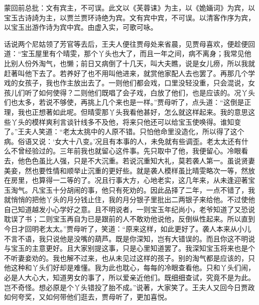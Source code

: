 \begin{parag}
    \begin{note}蒙回前总批：文有宾主，不可误。此文以《芙蓉诔》为主，以《姽婳词》为宾，以宝玉古诗䛴为主，以贾兰贾环诗绝为宾。文有宾中宾，不可误。以清客作序为宾，以宝玉出游作诗为宾中宾。由虚入实，可歌可咏。\end{note}
\end{parag}


\begin{parag}
    话说两个尼姑领了芳官等去后，王夫人便往贾母处来省晨，见贾母喜欢，便趁便回道：“宝玉屋里有个晴雯，那个丫头也大了，而且一年之间，病不离身；我常见他比别人份外淘气，也懒；前日又病倒了十几天，叫大夫瞧，说是女儿痨，所以我就赶著叫他下去了。若养好了也不用叫他进来，就赏他家配人去也罢了。再那几个学戏的女孩子，我也作主放出去了。一则他们都会戏，口里没轻没重，只会混说，女孩儿们听了如何使得？二则他们既唱了会子戏，白放了他们，也是应该的。况丫头们也太多，若说不够使，再挑上几个来也是一样。”贾母听了，点头道：“这倒是正理，我也正想著如此呢。但晴雯那丫头我看他甚好，怎么就这样起来。我的意思这些丫头的模样爽利言谈针线多不及他，将来只他还可以给宝玉使唤得。谁知变了。”王夫人笑道：“老太太挑中的人原不错。只怕他命里没造化，所以得了这个病。俗语又说：‘女大十八变。’况且有本事的人，未免就有些调歪。老太太还有什么不曾经验过的。三年前我也就留心这件事。先只取中了他，我便留心。冷眼看去，他色色虽比人强，只是不大沉重。若说沉重知大礼，莫若袭人第一。虽说贤妻美妾，然也要性情和顺举止沉重的更好些。就是袭人模样虽比晴雯略次一等，然放在房里，也算得一二等的了。况且行事大方，心地老实，这几年来，从未逢迎著宝玉淘气。凡宝玉十分胡闹的事，他只有死劝的。因此品择了二年，一点不错了，我就悄悄的把他丫头的月分钱止住，我的月分银子里批出二两银子来给他。不过使他自己知道越发小心学好之意。且不明说者，一则宝玉年纪尚小，老爷知道了又恐说耽误了书；二则宝玉再自为已是跟前的人不敢劝他说他，反倒纵性起来。所以直到今日才回明老太太。”贾母听了，笑道：“原来这样，如此更好了。袭人本来从小儿不言不语，我只说他是没嘴的葫芦。既是你深知，岂有大错误的。而且你这不明说与宝玉的主意更好。且大家别提这事，只是心里知道罢了。我深知宝玉将来也是个不听妻妾劝的。我也解不过来，也从未见过这样的孩子。别的淘气都是应该的，只他这种和丫头们好却是难懂。我为此也耽心，每每的冷眼查看他。只和丫头们闹，必是人大心大，知道男女的事了，所以爱亲近他们。既细细查试，究竟不是为此。岂不奇怪。想必原是个丫头错投了胎不成。”说著，大家笑了。王夫人又回今日贾政如何夸奖，又如何带他们逛去，贾母听了，更加喜悦。
\end{parag}


